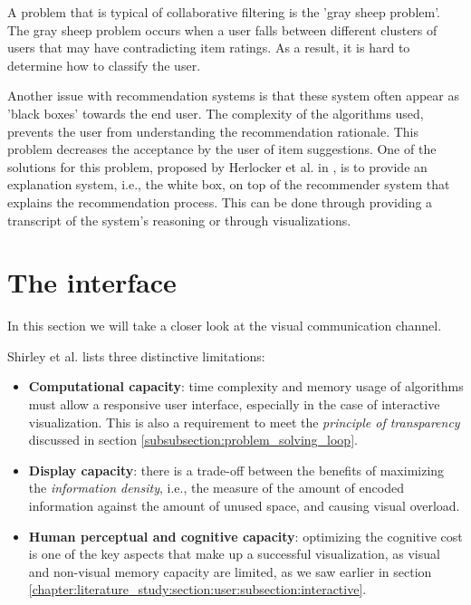 
A problem that is typical of collaborative filtering is the 'gray sheep problem'\cite{burke:2002, herlocker:2000}. The gray sheep problem occurs when a user falls between different clusters of users that may have contradicting item ratings. As a result, it is hard to determine how to classify the user\cite{burke:2002}.


Another issue with recommendation systems is that these system often appear as 'black boxes' towards the end user. The complexity of the algorithms used, prevents the user from understanding the recommendation rationale\cite{zhao:2010}. This problem decreases the acceptance by the user of item suggestions. One of the solutions for this problem, proposed by Herlocker et al. in \cite{herlocker:2000}, is to provide an explanation system, i.e., the white box, on top of the recommender system that explains the recommendation process. This can be done through providing a transcript of the system's reasoning or through visualizations\cite{herlocker:2000}.






% 
\section{The interface}\label{chapter:literature_study:section:interaction}

In this section we will take a closer look at the visual communication channel.

Shirley et al.\cite{shirley:2009} lists three distinctive limitations:

\begin{itemize}
	\item \textbf{Computational capacity}: time complexity and memory usage of algorithms must allow a responsive user interface, especially in the case of interactive visualization. This is also a requirement to meet the \emph{principle of transparency} discussed in section \ref{subsubsection:problem_solving_loop}.
	\item \textbf{Display capacity}: there is a trade-off between the benefits of maximizing the \emph{information density}, i.e., the measure of the amount of encoded information against the amount of unused space, and causing visual overload.
	\item \textbf{Human perceptual and cognitive capacity}: optimizing the cognitive cost is one of the key aspects that make up a successful visualization, as visual and non-visual memory capacity are limited\cite{ware:2004}, as we saw earlier in section \ref{chapter:literature_study:section:user:subsection:interactive}.
\end{itemize}

